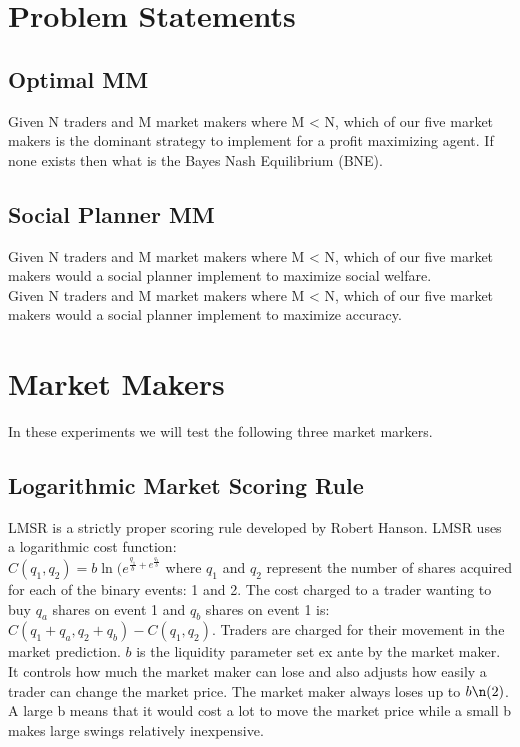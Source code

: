 \section{Problem Statements}
\subsection{Optimal MM}
Given N traders and M market makers where M < N, which of our five market makers is the
dominant strategy to implement for a profit maximizing agent. 
If none exists then what is the Bayes Nash Equilibrium (BNE).\\

\subsection{Social Planner MM}
Given N traders and M market makers where M < N, which of our five market makers would
a social planner implement to maximize social welfare.\\

Given N traders and M market makers where M < N, which of our five market makers would
a social planner implement to maximize accuracy.

\section{Market Makers}
In these experiments we will test the following three market markers.

\subsection{Logarithmic Market Scoring Rule}
LMSR is a strictly proper scoring rule developed by Robert Hanson. LMSR uses a logarithmic cost function: \\
$C(q_1,q_2) = b\ln(e^{\frac{q_1}{b} + e^{\frac{q_2}{b}}}$ where $q_1$ and $q_2$ represent the number of shares acquired for each of the binary events: 1 and 2. The cost charged to a trader wanting to buy $q_a$ shares on event 1 and $q_b$ shares on event 1 is: $C(q_1 + q_a, q_2 + q_b) - C(q_1,q_2)$. Traders are charged for their movement in the market prediction. $b$ is the liquidity parameter set ex ante by the market maker. It controls how much the market maker can lose and also adjusts how easily a trader can change the market price. The market maker always loses up to $b\n(2)$. A large b means that it would cost a lot to move the market price while a small b makes large swings relatively inexpensive.\\

